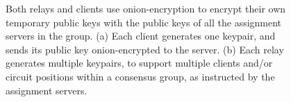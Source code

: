 \begin{figure}[t]
  \centering
  
  \caption{Both relays and clients use onion-encryption to encrypt their own
temporary public keys with the public keys of all the assignment servers in the
group. (a) Each client generates one keypair, and sends its public key onion-encrypted
to the server. (b) Each relay generates multiple keypairs, to support
multiple clients and/or circuit positions within a consensus group,
as instructed by the assignment servers.}
  
  \label{figure:transfer}
\end{figure}
